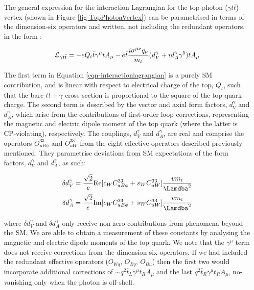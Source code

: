 The general expression for the interaction Lagrangian for the top-photon ($\gamma t \bar{t}$) vertex (shown in Figure \ref{fig-TopPhotonVertex}) can be parametrised in terms of the dimension-six operators and written, not including the redundant operators, in the form \cite{anom-coups}:

\begin{equation} \label{eqn-interactionlagrangian}
\mathcal{L}_{\gamma t\bar{t}} = -eQ_t\bar{t}\gamma^{\mu}tA_{\mu} - e\bar{t}\frac{i\sigma^{\mu\nu}q_{\nu}}{m_t}(d^{\gamma}_V+id^{\gamma}_A\gamma^5)tA_{\mu}
\end{equation}

The first term in Equation \ref{eqn-interactionlagrangian} is a purely SM contribution, and is linear with respect to electrical charge of the top, $Q_t$, such that the bare $t\bar{t}+\gamma$ cross-section is proportional to the square of the top-quark charge. The second term is described by the vector and axial form factors, $d^{\gamma}_V$ and $d^{\gamma}_A$, which arise from the contributions of first-order loop corrections, representing the magnetic and electric dipole moment of the top quark (where the latter is CP-violating), respectively. The couplings, $d^{\gamma}_V$ and $d^{\gamma}_A$, are real and comprise the operators $O^{33}_{uB\phi}$ and $O^{33}_{uW}$ from the eight effective operators described previously mentioned. They parametrise deviations from SM expectations of the form factors, $d^{\gamma}_V$ and $d^{\gamma}_A$, as such:

\begin{align}\label{eqn-smparameterisations}
\delta d^{\gamma}_V = \frac{\sqrt{2}}{e}\text{Re}[c_WC^{33}_{uB\phi} + s_WC^{33}_{uW}]\frac{vm_t}{\Lamdba^2} \\
\delta d^{\gamma}_A = \frac{\sqrt{2}}{e}\text{Im}[c_WC^{33}_{uB\phi} + s_WC^{33}_{uW}]\frac{vm_t}{\Lamdba^2}
\end{align}

where $\delta d^{\gamma}_V$ and $\delta d^{\gamma}_A$ only receive non-zero contributions from phenomena beyond the SM. We are able to obtain a measurement of these constants by analysing the magnetic and electric dipole moments of the top quark. We note that the $\gamma^{\mu}$ term does not receive corrections from the dimension-six operators. If we had included the redundant effective operators ($O_{Wq}$, $O_{Bq}$, $O_{Bu}$) then the first two would incorporate additional corrections of $\sim q^2 \bar{t}_L \gamma^{\mu} t_R A_{\mu}$ and the last $q^2 \bar{t}_R \gamma^{\mu} t_R A_{\mu}$, no-vanishing only when the photon is off-shell.

